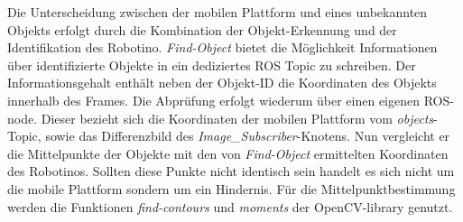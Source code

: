 	
	Die Unterscheidung zwischen der mobilen Plattform und eines unbekannten Objekts erfolgt durch die Kombination der Objekt-Erkennung und der Identifikation des Robotino. \textit{Find-Object} bietet die Möglichkeit Informationen über identifizierte Objekte in ein dediziertes ROS Topic zu schreiben. Der Informationsgehalt enthält neben der Objekt-ID die Koordinaten des Objekts innerhalb des Frames. Die Abprüfung erfolgt wiederum über einen eigenen ROS-node. Dieser bezieht sich die Koordinaten der mobilen Plattform vom \textit{objects}-Topic, sowie das Differenzbild des \textit{Image\_Subscriber}-Knotens. Nun vergleicht er die Mittelpunkte der Objekte mit den von \textit{Find-Object} ermittelten Koordinaten des Robotinos. Sollten diese Punkte nicht identisch sein handelt es sich nicht um die mobile Plattform sondern um ein Hindernis. Für die Mittelpunktbestimmung werden die Funktionen \textit{find-contours} und \textit{moments} der OpenCV-library genutzt. 


